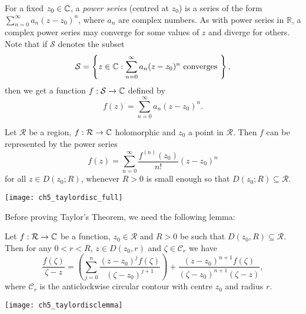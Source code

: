 For a fixed $z_0 \in \mathbb{C}$, a \emph{power series} (centred at $z_0$) is a series of the form $\displaystyle \sum_{n=0}^{\infty} a_n (z-z_0)^n$, where $a_n$ are complex numbers.  As with power series in $\mathbb{R}$, a complex power series may converge for some values of $z$ and diverge for others.  Note that if $\mathcal{S}$ denotes the subset
\[
\mathcal{S} = \left\{ z \in \mathbb{C}: \sum_{n=0}^{\infty} a_n(z-z_0)^n \text{ converges } \right\},
\]
then we get a function $f:\mathcal{S} \to \mathbb{C}$ defined by
\[
f(z) = \sum_{n=0}^{\infty} a_n (z-z_0)^n.
\]


\begin{theorem}
\label{t:taylor}
Let $\mathcal{R}$ be a region, $f:\mathcal{R} \to \mathbb{C}$ holomorphic and $z_0$ a point in $\mathcal{R}$.  Then $f$ can be represented by the power series
\[
f(z) = \sum_{n=0}^{\infty} \frac{f^{(n)}(z_0)}{n!} (z-z_0)^n
\]
for all $z \in D(z_0;R)$, whenever $R>0$ is small enough so that $D(z_0;R) \subseteq \mathcal{R}$.
\end{theorem}
\begin{center}
\texttt{[image: ch5\_taylordisc\_full]}
\end{center}
Before proving Taylor's Theorem, we need the following lemma:
\begin{lemma}
\label{l:taylor}
Let $f:\mathcal{R} \to \mathbb{C}$ be a function, $z_0 \in \mathcal{R}$ and $R>0$ be such that $D(z_0,R) \subseteq \mathcal{R}$.  Then for any $0<r<R$, $z \in D(z_0,r)$ and $\zeta \in \mathcal{C}_r$ we have
\[
\frac{f(\zeta)}{\zeta-z} = \left( \sum_{j=0}^n \frac{(z-z_0)^jf(\zeta)}{(\zeta-z_0)^{j+1}} \right) + \frac{(z-z_0)^{n+1} f ( \zeta)}{(\zeta-z_0)^{n+1}(\zeta-z)},
\]
where $\mathcal{C}_r$ is the anticlockwise circular contour with centre $z_0$ and radius $r$.
\begin{center}
\texttt{[image: ch5\_taylordisclemma]}
\end{center}
\end{lemma}

